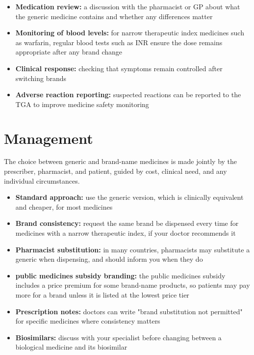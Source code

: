 \begin{itemize}
    \item \textbf{Medication review:} a discussion with the pharmacist or GP about what the generic medicine contains and whether any differences matter
    \item \textbf{Monitoring of blood levels:} for narrow therapeutic index medicines such as warfarin, regular blood tests such as INR ensure the dose remains appropriate after any brand change
    \item \textbf{Clinical response:} checking that symptoms remain controlled after switching brands
    \item \textbf{Adverse reaction reporting:} suspected reactions can be reported to the TGA to improve medicine safety monitoring
\end{itemize}

\section*{Management}
The choice between generic and brand-name medicines is made jointly by the prescriber, pharmacist, and patient, guided by cost, clinical need, and any individual circumstances.

\begin{itemize}
    \item \textbf{Standard approach:} use the generic version, which is clinically equivalent and cheaper, for most medicines
    \item \textbf{Brand consistency:} request the same brand be dispensed every time for medicines with a narrow therapeutic index, if your doctor recommends it
    \item \textbf{Pharmacist substitution:} in many countries, pharmacists may substitute a generic when dispensing, and should inform you when they do
    \item \textbf{public medicines subsidy branding:} the public medicines subsidy includes a price premium for some brand-name products, so patients may pay more for a brand unless it is listed at the lowest price tier
    \item \textbf{Prescription notes:} doctors can write "brand substitution not permitted" for specific medicines where consistency matters
    \item \textbf{Biosimilars:} discuss with your specialist before changing between a biological medicine and its biosimilar
\end{itemize}

